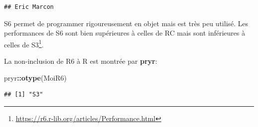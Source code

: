 \documentclass[
  12pt,
  french,
  a4paper,
  extrafontsizes,onecolumn,openright
  ]{memoir}
\newenvironment{Shaded}{\begin{snugshade}}{\end{snugshade}}
\newcommand{\ControlFlowTok}[1]{\textcolor[rgb]{0.13,0.29,0.53}{\textbf{#1}}}
\newcommand{\DataTypeTok}[1]{\textcolor[rgb]{0.13,0.29,0.53}{#1}}
\newcommand{\KeywordTok}[1]{\textcolor[rgb]{0.13,0.29,0.53}{\textbf{#1}}}
\newcommand{\NormalTok}[1]{#1}
\newcommand{\OperatorTok}[1]{\textcolor[rgb]{0.81,0.36,0.00}{\textbf{#1}}}
\newcommand{\OtherTok}[1]{\textcolor[rgb]{0.56,0.35,0.01}{#1}}
\newcommand{\StringTok}[1]{\textcolor[rgb]{0.31,0.60,0.02}{#1}}
\newlength{\rf}
\begin{document}
\scriptsize

\begin{Shaded}
\end{Shaded}

\begin{verbatim}
## Eric Marcon
\end{verbatim}

\normalsize

S6 permet de programmer rigoureusement en objet mais est très peu utilisé.
Les performances de S6 sont bien supérieures à celles de RC mais sont inférieures à celles de S3\footnote{\url{https://r6.r-lib.org/articles/Performance.html}}.

La non-inclusion de R6 à R est montrée par \textbf{pryr}:

\scriptsize

\begin{Shaded}
\begin{Highlighting}[]
\NormalTok{pryr}\OperatorTok{::}\KeywordTok{otype}\NormalTok{(MoiR6)}
\end{Highlighting}
\end{Shaded}

\begin{verbatim}
## [1] "S3"
\end{verbatim}
\end{document}
